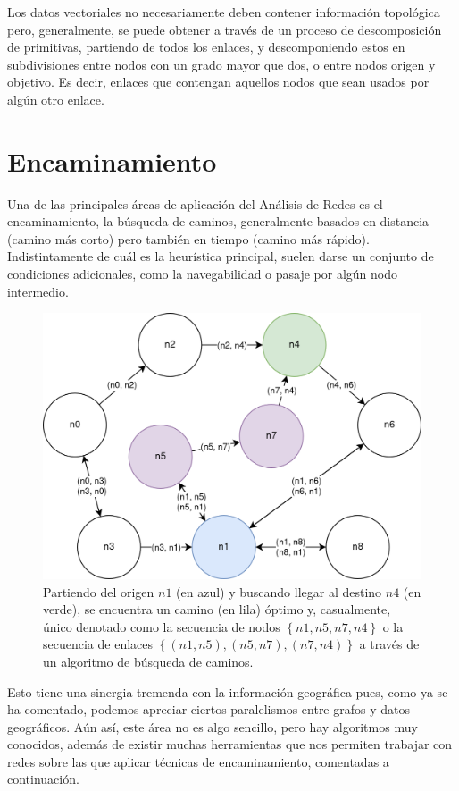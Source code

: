 Los datos vectoriales no necesariamente deben contener información topológica  pero, generalmente, se puede obtener a través de un proceso de descomposición de primitivas, partiendo de todos los enlaces, y descomponiendo estos en subdivisiones entre nodos con un grado mayor que dos, o entre nodos origen y objetivo. Es decir, enlaces que contengan aquellos nodos que sean usados por algún otro enlace.

\section{Encaminamiento}
Una de las principales áreas de aplicación del Análisis de Redes es el encaminamiento, la búsqueda de caminos, generalmente basados en distancia (camino más corto) pero también en tiempo (camino más rápido). Indistintamente de cuál es la heurística principal, suelen darse un conjunto de condiciones adicionales, como la navegabilidad o pasaje por algún nodo intermedio.

\begin{figure}[htbp]
	\centering
	\includegraphics[width=.9\textwidth]{img/example_graph_path.png}
	\caption[Encaminamiento en un grafo dirigido]{Partiendo del origen $n1$ (en azul) y buscando llegar al destino $n4$ (en verde), se encuentra un camino (en lila) óptimo y, casualmente, único denotado como la secuencia de nodos $\left\lbrace n1, n5, n7, n4 \right\rbrace$ o la secuencia de enlaces $\left\lbrace (n1, n5), (n5, n7), (n7, n4) \right\rbrace$ a través de un algoritmo de búsqueda de caminos.}
\end{figure}

Esto tiene una sinergia tremenda con la información geográfica pues, como ya se ha comentado, podemos apreciar ciertos paralelismos entre grafos y datos geográficos. Aún así, este área no es algo sencillo, pero hay algoritmos muy conocidos, además de existir muchas herramientas que nos permiten trabajar con redes sobre las que aplicar técnicas de encaminamiento, comentadas a continuación.

